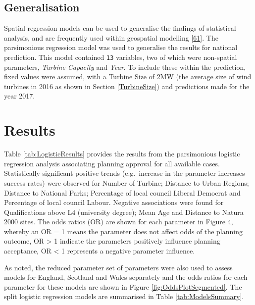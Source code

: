 \documentclass[a4paper,]{article}
\theoremstyle{definition}
\theoremstyle{definition}
\theoremstyle{definition}
\theoremstyle{remark}
\begin{document}
\subsection{Generalisation}\label{generalisation}

Spatial regression models can be used to generalise the findings of
statistical analysis, and are frequently used within geospatial
modelling {[}\protect\hyperlink{ref-Ward2008}{61}{]}. The parsimonious
regression model was used to generalise the results for national
prediction. This model contained \texttt{13} variables, two of which
were non-spatial parameters, \emph{Turbine Capacity} and \emph{Year}. To
include these within the prediction, fixed values were assumed, with a
Turbine Size of 2MW (the average size of wind turbines in 2016 as shown
in Section \ref{TurbineSize}) and predictions made for the year 2017.

\section{Results}\label{results}

Table \ref{tab:LogisticResults} provides the results from the
parsimonious logistic regression analysis associating planning approval
for all available cases. Statistically significant positive trends
(e.g.~increase in the parameter increases success rates) were observed
for Number of Turbine; Distance to Urban Regions; Distance to National
Parks; Percentage of local council Liberal Democrat and Percentage of
local council Labour. Negative associations were found for
Qualifications above L4 (university degree); Mean Age and Distance to
Natura 2000 sites. The odds ratios (OR) are shown for each parameter in
Figure 4, whereby an OR = 1 means the parameter does not affect odds of
the planning outcome, OR \textgreater{} 1 indicate the parameters
positively influence planning acceptance, OR \textless{} 1 represents a
negative parameter influence.

As noted, the reduced parameter set of parameters were also used to
assess models for England, Scotland and Wales separately and the odds
ratios for each parameter for these models are shown in Figure
\ref{fig:OddsPlotSegmented}. The split logistic regression models are
summarised in Table \ref{tab:ModelsSummary}.
\end{document}
